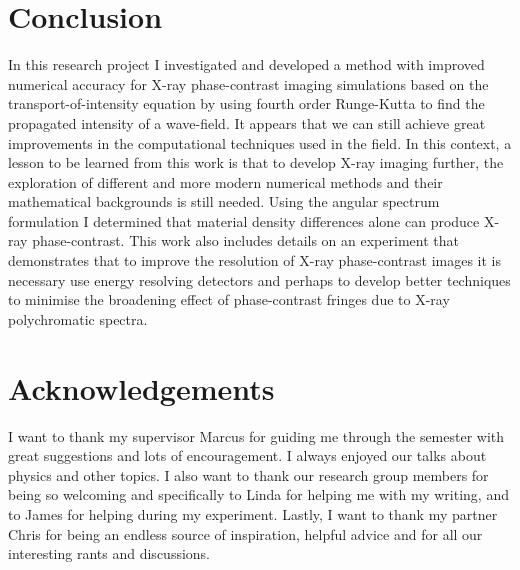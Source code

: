 \documentclass[10pt, a4paper, singlespacing]{report}
\begin{document}


\chapter*{Conclusion}\label{Conclusion}

In this research project I investigated and developed a method with improved numerical accuracy for X-ray phase-contrast imaging simulations based on the transport-of-intensity equation by using fourth order Runge-Kutta to find the propagated intensity of a wave-field. It appears that we can still achieve great improvements in the computational techniques used in the field. In this context, a lesson to be learned from this work is that to develop X-ray imaging further, the exploration of different and more modern numerical methods and their mathematical backgrounds is still needed.
Using the angular spectrum formulation I determined that material density differences alone can produce X-ray phase-contrast. This work also includes details on an experiment that demonstrates that to improve the resolution of X-ray phase-contrast images it is necessary use energy resolving detectors and perhaps to develop better techniques to minimise the broadening effect of phase-contrast fringes due to X-ray polychromatic spectra. 



\chapter*{Acknowledgements}\label{Acknowledgements}

I want to thank my supervisor Marcus for guiding me through the semester with great suggestions and lots of encouragement. I always enjoyed our talks about physics and other topics. I also want to thank our research group members for being so welcoming and specifically to Linda for helping me with my writing, and to James for helping during my experiment. Lastly, I want to thank my partner Chris for being an endless source of inspiration, helpful advice and for all our interesting rants and discussions.  




\end{document}
